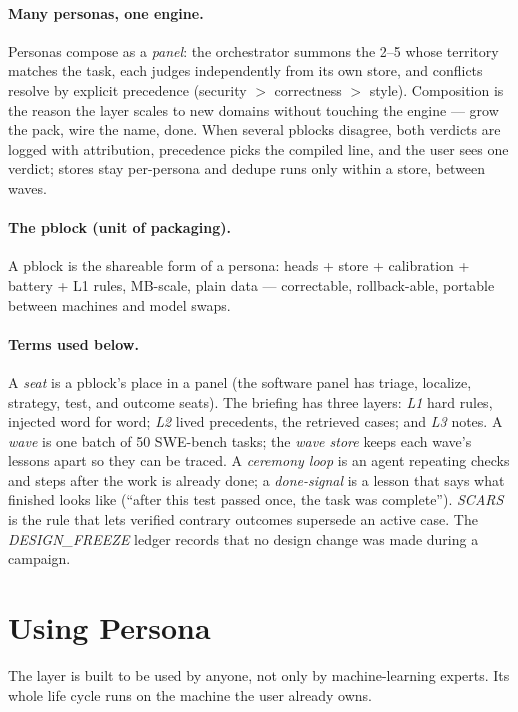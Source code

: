 \documentclass[11pt]{article}
\begin{document}
\paragraph{Many personas, one engine.} Personas compose as a \emph{panel}: the orchestrator summons the 2--5 whose territory matches the task, each judges independently from its own store, and conflicts resolve by explicit precedence (security $>$ correctness $>$ style). Composition is the reason the layer scales to new domains without touching the engine --- grow the pack, wire the name, done. When several pblocks disagree, both verdicts are logged with attribution, precedence picks the compiled line, and the user sees one verdict; stores stay per-persona and dedupe runs only within a store, between waves.

\paragraph{The pblock (unit of packaging).} A pblock is the shareable form of a persona: heads + store + calibration + battery + L1 rules, MB-scale, plain data --- correctable, rollback-able, portable between machines and model swaps.

\paragraph{Terms used below.} A \emph{seat} is a pblock's place in a panel (the software panel has triage, localize, strategy, test, and outcome seats). The briefing has three layers: \emph{L1} hard rules, injected word for word; \emph{L2} lived precedents, the retrieved cases; and \emph{L3} notes. A \emph{wave} is one batch of 50 SWE-bench tasks; the \emph{wave store} keeps each wave's lessons apart so they can be traced. A \emph{ceremony loop} is an agent repeating checks and steps after the work is already done; a \emph{done-signal} is a lesson that says what finished looks like (``after this test passed once, the task was complete''). \emph{SCARS} is the rule that lets verified contrary outcomes supersede an active case. The \emph{DESIGN\_FREEZE} ledger records that no design change was made during a campaign.

\section{Using Persona}
\label{sec:using}

The layer is built to be used by anyone, not only by machine-learning experts. Its whole life cycle runs on the machine the user already owns.
\end{document}
